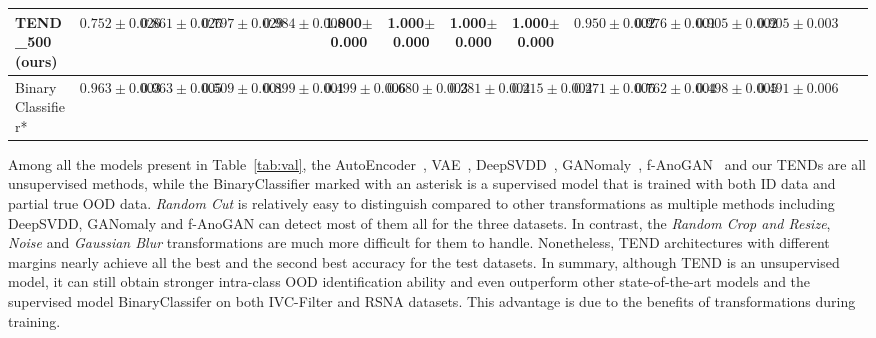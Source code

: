 \documentclass[12pt]{spieman}  %
\begin{document}
\begin{spacing}{2}
\begin{table} [htp]
{\begin{tabular}{|l|cccc|cccc|cccc|cccc|}
TEND\_500 (\textbf{ours})    & {$0.752\pm0.026$}      & {$0.861\pm0.026$}       & {$0.797\pm0.029$}& {$0.984\pm0.008$} & {\textbf{1.000$\pm$0.000}}      & {\textbf{1.000$\pm$0.000}}       &{\textbf{1.000$\pm$0.000}}   & {\textbf{1.000$\pm$0.000}}   & {$0.950\pm0.002$} & {$0.976\pm0.001$} & {$0.905\pm0.002$} & {$0.905\pm0.003$} \\ 
\hline
BinaryClassifier*    & {$0.963\pm0.003$}     & {$0.963\pm0.005$}    & {$0.509\pm0.001$}  & {$0.899\pm0.001$}  & {$0.499\pm0.006$}      & {$0.680\pm0.003$}   & {$0.281\pm0.004$}  & {$0.215\pm0.004$}  &{$0.271\pm0.006$} & {$0.762\pm0.004$} & {$0.498\pm0.005$} & {$0.491\pm0.006$} \\ \hline
\end{tabular}%
}
\end{table}
Among all the models present in Table~\ref{tab:val}, the AutoEncoder~\cite{mcclelland1986parallel}, VAE~\cite{an2015variational:an}, DeepSVDD~\cite{ruff2018deep:ruff}, GANomaly~\cite{akcay2018ganomaly:akcay}, f-AnoGAN~\cite{schlegl2019f} and our TENDs are all unsupervised methods, while the BinaryClassifier marked with an asterisk is a supervised model that is trained with both ID data and partial true OOD data. 
{\textit{Random Cut} is relatively easy to distinguish compared to other transformations as multiple methods including DeepSVDD, GANomaly and f-AnoGAN can detect most of them all for the three datasets. In contrast, the \textit{Random Crop and Resize}, \textit{Noise} and \textit{Gaussian Blur} transformations are much more difficult for them to handle. Nonetheless, TEND architectures with different margins nearly achieve all the best and the second best accuracy for the test datasets. In summary, although TEND is an unsupervised model, it can still obtain stronger intra-class OOD identification ability and even outperform other state-of-the-art models and the supervised model BinaryClassifer on both IVC-Filter and RSNA datasets. This advantage is due to the benefits of transformations during training. }



\end{spacing}
\end{document}
